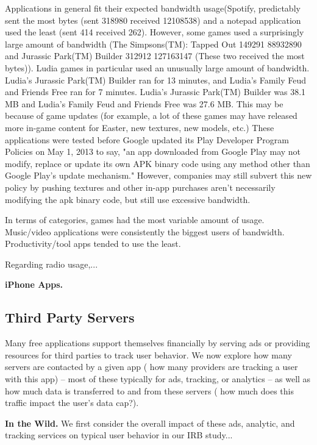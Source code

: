 Applications in general fit their expected bandwidth usage(Spotify, predictably sent the most bytes (sent 318980 received 12108538) and a notepad application used the least (sent 414 received 262). However, some games used a surprisingly large amount of bandwidth (The Simpsons(TM): Tapped Out 149291 88932890 and Jurassic Park(TM) Builder
 312912 127163147 (These two received the most bytes)). Ludia games in particular used an unusually large amount of bandwidth. Ludia's Jurassic Park(TM) Builder ran for 13 minutes, and Ludia's Family Feud and Friends Free ran for 7 minutes. Ludia's Jurassic Park(TM) Builder was 38.1 MB  and Ludia's Family Feud and Friends Free was 27.6 MB. This may be because of game updates (for example, a lot of these games may have released more in-game content for Easter, new textures, new models, etc.) These applications were tested before Google updated its Play Developer Program Policies on May 1, 2013 to say, "an app downloaded from Google Play may not modify, replace or update its own APK binary code using any method other than Google Play's update mechanism." However, companies may still subvert this new policy by pushing textures and other in-app purchases aren't necessarily modifying the apk binary code, but still use excessive bandwidth. 
 
In terms of categories, games had the most variable amount of usage. Music/video applications were consistently the biggest users of bandwidth. Productivity/tool apps tended to use the least.

    Regarding radio usage,...

  {\bf iPhone Apps.}

\subsection{Third Party Servers}
  Many free applications support themselves financially by serving ads or providing resources for third parties to track user behavior.
  We now explore how many servers are contacted by a given app (\ie{} how many providers are tracking a user with this app) -- most of these typically for ads, tracking, or analytics -- as well as how much data is transferred to and from these servers (\ie{} how much does this traffic impact the user's data cap?).

  {\bf In the Wild.}
  We first consider the overall impact of these ads, analytic, and tracking services on typical user behavior in our IRB study...

